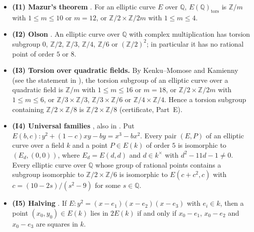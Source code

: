 \documentclass[11pt]{article}
\newcommand{\Q}{\mathbb Q}
\newcommand{\Z}{\mathbb Z}
\newcommand{\tors}{\mathrm{tors}}
\begin{document}
\begin{itemize}
\item \textbf{(I1) Mazur's theorem} \cite[Theorem~(8)]{Ma}. For an elliptic curve \(E\) over \(\Q\), \(E(\Q)_\tors\)
is \(\Z/m\) with \(1\le m\le10\) or \(m=12\), or \(\Z/2\times\Z/2m\) with \(1\le m\le4\).

\item \textbf{(I2) Olson} \cite{Ol}. An elliptic curve over \(\Q\) with complex multiplication has torsion subgroup
\(0\), \(\Z/2\), \(\Z/3\), \(\Z/4\), \(\Z/6\) or \((\Z/2)^2\); in particular it has no rational point of order \(5\)
or \(8\).

\item \textbf{(I3) Torsion over quadratic fields.} By Kenku--Momose \cite[Theorem~(0.1)]{KM} and Kamienny
\cite{Ka} (see the statement in \cite[Section~1]{Na}), the torsion subgroup of an elliptic curve over a quadratic
field is \(\Z/m\) with \(1\le m\le16\) or \(m=18\), or \(\Z/2\times\Z/2m\) with \(1\le m\le6\), or
\(\Z/3\times\Z/3\), \(\Z/3\times\Z/6\) or \(\Z/4\times\Z/4\). Hence a torsion subgroup containing \(\Z/2\times\Z/8\)
is \(\Z/2\times\Z/8\) (certificate, Part~E).

\item \textbf{(I4) Universal families} \cite[Table~3]{Ku}, also in \cite[Table~3]{HLP}. Put
\(E(b,c)\colon y^2+(1-c)xy-by=x^3-bx^2\). Every pair \((E,P)\) of an elliptic curve over a field \(k\) and a point
\(P\in E(k)\) of order \(5\) is isomorphic to \((E_d,(0,0))\), where \(E_d=E(d,d)\) and \(d\in k^\times\) with
\(d^2-11d-1\neq0\). Every elliptic curve over \(\Q\) whose group of rational points contains a subgroup isomorphic
to \(\Z/2\times\Z/6\) is isomorphic to \(E(c+c^2,c)\) with \(c=(10-2s)/(s^2-9)\) for some \(s\in\Q\).

\item \textbf{(I5) Halving} \cite[Theorem~4.2]{Kn}. If \(E\colon y^2=(x-e_1)(x-e_2)(x-e_3)\) with \(e_i\in k\),
then a point \((x_0,y_0)\in E(k)\) lies in \(2E(k)\) if and only if \(x_0-e_1\), \(x_0-e_2\) and \(x_0-e_3\) are
squares in \(k\).


\end{itemize}
\end{document}
